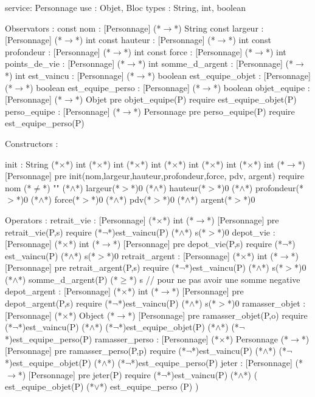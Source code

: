 \documentclass[a4paper, 11pt]{report}
\begin{document}
\begin{Spe}
service: Personnage
use : Objet, Bloc
types : String, int, boolean

Observators : 
	const nom : [Personnage] (*$\rightarrow$*) String
	const largeur : [Personnage] (*$\rightarrow$*) int
	const hauteur : [Personnage] (*$\rightarrow$*) int
	const profondeur : [Personnage] (*$\rightarrow$*) int
	const force : [Personnage] (*$\rightarrow$*) int 
	points_de_vie : [Personnage] (*$\rightarrow$*) int
	somme_d_argent : [Personnage] (*$\rightarrow$*) int 
	est_vaincu : [Personnage] (*$\rightarrow$*) boolean 
	est_equipe_objet : [Personnage] (*$\rightarrow$*) boolean
	est_equipe_perso : [Personnage] (*$\rightarrow$*) boolean 
	objet_equipe : [Personnage] (*$\rightarrow$*) Objet
		pre objet_equipe(P) require est_equipe_objet(P)
	perso_equipe : [Personnage] (*$\rightarrow$*) Personnage
		pre perso_equipe(P) require est_equipe_perso(P) 

Constructors : 

	init : String (*$\times$*) int (*$\times$*) int (*$\times$*) int (*$\times$*) int (*$\times$*) int (*$\times$*) int (*$\rightarrow$*) [Personnage]
		pre init(nom,largeur,hauteur,profondeur,force, pdv, argent) require nom (*$\neq$*) "" (*$\land$*) largeur(*$>$*)0 (*$\land$*) hauteur(*$>$*)0 (*$\land$*) profondeur(*$>$*)0 (*$\land$*) force(*$>$*)0 (*$\land$*) pdv(*$>$*)0 (*$\land$*) argent(*$>$*)0 

Operators :
	retrait_vie :  [Personnage] (*$\times$*) int (*$\rightarrow$*) [Personnage]
		pre retrait_vie(P,s) require (*$\lnot$*)est_vaincu(P) (*$\land$*) s(*$>$*)0
	depot_vie : [Personnage] (*$\times$*) int (*$\rightarrow$*) [Personnage]
		pre depot_vie(P,s) require (*$\lnot$*) est_vaincu(P) (*$\land$*) s(*$>$*)0
	retrait_argent :  [Personnage] (*$\times$*) int (*$\rightarrow$*) [Personnage]
		pre retrait_argent(P,s) require (*$\lnot$*)est_vaincu(P) (*$\land$*) s(*$>$*)0 (*$\land$*) somme_d_argent(P) (*$\ge$*) s // pour ne pas avoir une somme negative
	depot_argent : [Personnage] (*$\times$*) int (*$\rightarrow$*) [Personnage]
		pre depot_argent(P,s) require (*$\lnot$*)est_vaincu(P) (*$\land$*) s(*$>$*)0
	ramasser_objet : [Personnage] (*$\times$*) Object (*$\rightarrow$*) [Personnage]
		pre ramasser_objet(P,o) require (*$\lnot$*)est_vaincu(P) (*$\land$*) (*$\lnot$*)est_equipe_objet(P) (*$\land$*)  (*$\lnot$*)est_equipe_perso(P)
        ramasser_perso : [Personnage] (*$\times$*) Personnage (*$\rightarrow$*) [Personnage]
		pre ramasser_perso(P,p) require (*$\lnot$*)est_vaincu(P) (*$\land$*) (*$\lnot$*)est_equipe_objet(P) (*$\land$*) (*$\lnot$*)est_equipe_perso(P)
	jeter : [Personnage] (*$\rightarrow$*) [Personnage]
		pre jeter(P) require (*$\lnot$*)est_vaincu(P) (*$\land$*) ( est_equipe_objet(P) (*$\lor$*) est_equipe_perso (P) )


\end{Spe}
\end{document}

